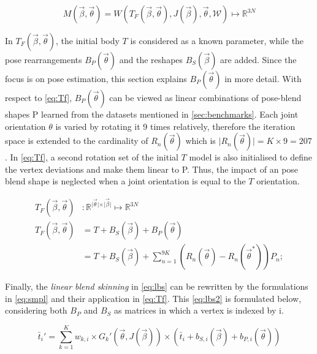 \begin{equation}
\label{eq:smpl}
M(\vec{\beta},\vec{\theta}) = W(T_{F}(\vec{\beta},\vec{\theta}),J(\vec{\beta}),\vec{\theta},\mathcal{W}) \mapsto \mathbb{R}^{3N}
\end{equation}

In $T_{F}(\vec{\beta},\vec{\theta})$, the initial body $T$ is considered as a known parameter, while the pose rearrangements $B_{P}(\vec{\theta})$ and the reshapes $B_{S}(\vec{\beta})$ are added. Since the focus is on pose estimation, this section explains $B_{P}(\vec{\theta})$ in more detail. With respect to \autoref{eq:Tf}, $B_{P}(\vec{\theta})$ can be viewed as linear combinations of pose-blend shapes P learned from the datasets mentioned in \autoref{sec:benchmarks}. Each joint orientation $\theta$ is varied by rotating it 9 times relatively, therefore the iteration space is extended to the cardinality of $R_{n}(\vec{\theta})$ which is $\vert R_{n}(\vec{\theta}) \vert = K \times 9 = 207$. In \autoref{eq:Tf}, a second rotation set of the initial $T$ model is also initialised to define the vertex deviations and make them linear to P. Thus, the impact of an pose blend shape is neglected when a joint orientation is equal to the $T$ orientation.

\begin{equation}
\label{eq:Tf}
	\begin{split}
		T_{F}(\vec{\beta},\vec{\theta})&: \mathbb{R}^{\vert \vec{\theta} 			\vert \times \vert \vec{\beta} \vert} \mapsto \mathbb{R}^{3N} \\
		T_{F}(\vec{\beta},\vec{\theta}) &= T + B_{S}(\vec{\beta}) + B_{P}				(\vec{\theta}) \\
		&= T + B_{S}(\vec{\beta}) + \sum_{n=1}^{9K} (R_{n}(\vec{\theta}) - 				R_{n}(\vec{\theta}^{*}))P_{n};
	\end{split}
\end{equation}

Finally, the \emph{linear blend skinning} in \autoref{eq:lbs} can be rewritten by the formulations in \autoref{eq:smpl} and their application in \autoref{eq:Tf}. This \autoref{eq:lbs2} is formulated below, considering both $B_{P}$ and $B_{S}$ as matrices in which a vertex is indexed by i.

\begin{equation}
\label{eq:lbs2}
\bar{t}_{i}' = \sum_{k=1}^{K} w_{k,i} \times G_{k}'(\vec{\theta},J(\vec{\beta})) \times (\bar{t}_{i} + b_{S,i}(\vec{\beta}) +b_{P,i}(\vec{\theta}))
\end{equation}


\cite{smpl}

